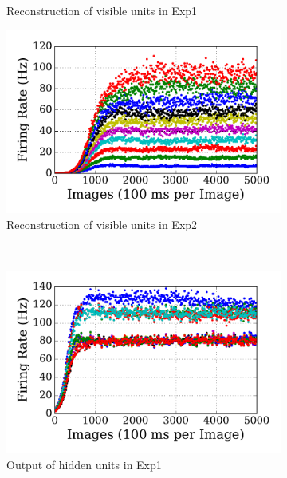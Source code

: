 \begin{figure}
\begin{subfigure}[t]{0.48\textwidth}
		\caption{Reconstruction of visible units in Exp1}
	\end{subfigure}
	\begin{subfigure}[t]{0.48\textwidth}
		\includegraphics[width=\textwidth]{pics_sdlm/00_exp_SAE_Orig/exp2_recon_s.pdf}
		\caption{Reconstruction of visible units in Exp2}
	\end{subfigure}\\
	\begin{subfigure}[t]{0.48\textwidth}
		\includegraphics[width=\textwidth]{pics_sdlm/00_exp_SAE_Orig/exp1_hid_s.pdf}
		\caption{Output of hidden units in Exp1}
	\end{subfigure}
	\begin{subfigure}[t]{0.48\textwidth}

\end{subfigure}
\end{figure}
